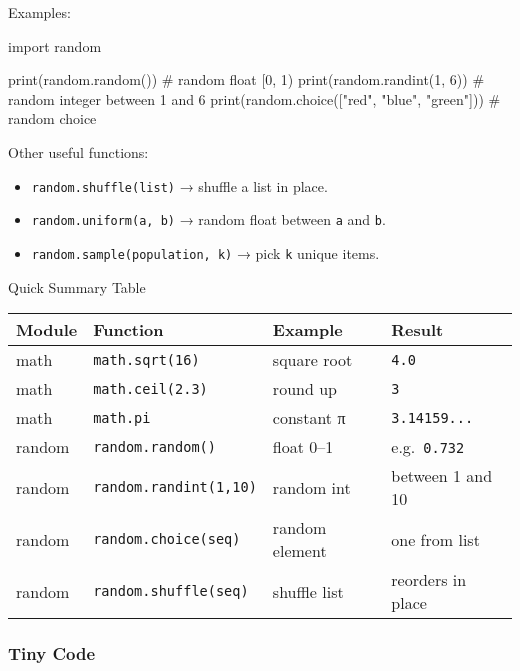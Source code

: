 \documentclass[
  letterpaper,
  DIV=11,
  numbers=noendperiod]{scrreprt}
\newenvironment{Shaded}{\begin{snugshade}}{\end{snugshade}}
\newcommand{\BuiltInTok}[1]{\textcolor[rgb]{0.00,0.23,0.31}{#1}}
\newcommand{\CommentTok}[1]{\textcolor[rgb]{0.37,0.37,0.37}{#1}}
\newcommand{\DecValTok}[1]{\textcolor[rgb]{0.68,0.00,0.00}{#1}}
\newcommand{\ImportTok}[1]{\textcolor[rgb]{0.00,0.46,0.62}{#1}}
\newcommand{\NormalTok}[1]{\textcolor[rgb]{0.00,0.23,0.31}{#1}}
\newcommand{\StringTok}[1]{\textcolor[rgb]{0.13,0.47,0.30}{#1}}
\providecommand{\tightlist}{%
  \setlength{\itemsep}{0pt}\setlength{\parskip}{0pt}}
\begin{document}
Examples:

\begin{Shaded}
\begin{Highlighting}[]
\ImportTok{import}\NormalTok{ random}

\BuiltInTok{print}\NormalTok{(random.random())        }\CommentTok{\# random float [0, 1)}
\BuiltInTok{print}\NormalTok{(random.randint(}\DecValTok{1}\NormalTok{, }\DecValTok{6}\NormalTok{))   }\CommentTok{\# random integer between 1 and 6}
\BuiltInTok{print}\NormalTok{(random.choice([}\StringTok{"red"}\NormalTok{, }\StringTok{"blue"}\NormalTok{, }\StringTok{"green"}\NormalTok{]))  }\CommentTok{\# random choice}
\end{Highlighting}
\end{Shaded}

Other useful functions:

\begin{itemize}
\tightlist
\item
  \texttt{random.shuffle(list)} → shuffle a list in place.
\item
  \texttt{random.uniform(a,\ b)} → random float between \texttt{a} and
  \texttt{b}.
\item
  \texttt{random.sample(population,\ k)} → pick \texttt{k} unique items.
\end{itemize}

Quick Summary Table

\begin{longtable}[]{@{}llll@{}}
\toprule\noalign{}
Module & Function & Example & Result \\
\midrule\noalign{}
\endhead
\bottomrule\noalign{}
\endlastfoot
math & \texttt{math.sqrt(16)} & square root & \texttt{4.0} \\
math & \texttt{math.ceil(2.3)} & round up & \texttt{3} \\
math & \texttt{math.pi} & constant π & \texttt{3.14159...} \\
random & \texttt{random.random()} & float 0--1 & e.g.~\texttt{0.732} \\
random & \texttt{random.randint(1,10)} & random int & between 1 and
10 \\
random & \texttt{random.choice(seq)} & random element & one from list \\
random & \texttt{random.shuffle(seq)} & shuffle list & reorders in
place \\
\end{longtable}

\subsubsection{Tiny Code}\label{tiny-code-41}
\end{document}
